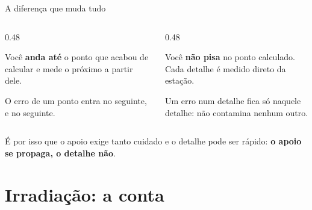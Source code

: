 \documentclass[aspectratio=169,11pt]{beamer}
\newcommand{\bnum}[1]{\textbf{\textcolor{mTeal}{#1}}}
\begin{document}
\begin{frame}{A diferença que muda tudo}
  \begin{columns}[T]
    \begin{column}{0.48\textwidth}
      \begin{armadilha}[title={Na poligonal}]
        Você \bnum{anda até} o ponto que acabou de calcular e mede o próximo a partir dele.
        \medskip

        O erro de um ponto \alert{entra} no seguinte, e no seguinte.
      \end{armadilha}
    \end{column}
    \begin{column}{0.48\textwidth}
      \begin{ideia}[title={Na irradiação}]
        Você \bnum{não pisa} no ponto calculado. Cada detalhe é medido direto da estação.
        \medskip

        Um erro num detalhe \alert{fica só naquele detalhe}: não contamina nenhum outro.
      \end{ideia}
    \end{column}
  \end{columns}
  \bigskip
  \centering
  É por isso que o apoio exige tanto cuidado e o detalhe pode ser rápido: \bnum{o apoio
  se propaga, o detalhe não}.
\end{frame}

\section{Irradiação: a conta}
\end{document}
